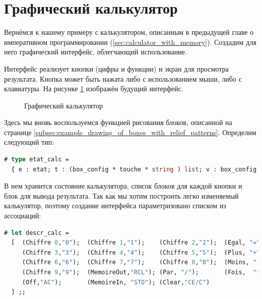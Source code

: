 \section{Графический калькулятор}
\label{sec:a_graphical_calculator}

Вернёмся к нашему примеру с калькулятором, описанным в предыдущей главе о 
императивном программировании (\ref{sec:calculator_with_memory}). Создадим для 
него графический интерфейс, облегчающий использование.

Интерфейс реализует кнопки (цифры и функции) и экран для просмотра результата. 
Кнопка может быть нажата либо с использованием мыши, либо с клавиатуры. На 
рисунке \ref{fig:graphical_calculator} изображён будущий интерфейс.

\begin{figure}[h]
	\caption{\label{fig:graphical_calculator}Графический калькулятор}
\end{figure}

Здесь мы вновь воспользуемся функцией рисования блоков, описанной на странице 
\ref{subsec:example_drawing_of_boxes_with_relief_patterns}. Определим следующий 
тип:

\begin{lstlisting}[language=OCaml]
# type etat_calc = 
  { e : etat; t : (box_config * touche * string ) list; v : box_config } ;;
\end{lstlisting}

В нем хранится состояние калькулятора, список блоков для каждой кнопки и блок 
для вывода результата. Так как мы хотим построить легко изменяемый калькулятор, 
поэтому создание интерфейса параметризовано списком из ассоциаций:

\begin{lstlisting}[language=OCaml]
# let descr_calc = 
  [  (Chiffre 0,"0");  (Chiffre 1,"1");    (Chiffre 2,"2");  (Egal, "=");
     (Chiffre 3,"3");  (Chiffre 4,"4");    (Chiffre 5,"5");  (Plus, "+"); 
     (Chiffre 6,"6");  (Chiffre 7,"7");    (Chiffre 8,"8");  (Moins, "-");
     (Chiffre 9,"9");  (MemoireOut,"RCL"); (Par, "/");       (Fois,  "*"); 
     (Off,"AC");       (MemoireIn, "STO"); (Clear,"CE/C") 
  ] ;;
\end{lstlisting}

